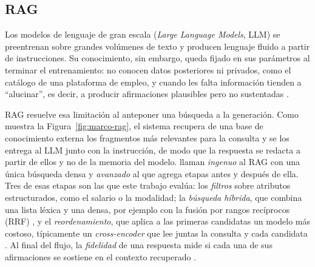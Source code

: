 \subsection{RAG}
\label{sec:marco-rag}

Los modelos de lenguaje de gran escala (\textit{Large Language Models}, LLM) se preentrenan sobre grandes volúmenes de texto y producen lenguaje fluido a partir de instrucciones. Su conocimiento, sin embargo, queda fijado en sus parámetros al terminar el entrenamiento: no conocen datos posteriores ni privados, como el catálogo de una plataforma de empleo, y cuando les falta información tienden a \enquote{alucinar}, es decir, a producir afirmaciones plausibles pero no sustentadas \citep{Gao2023}.

RAG \citep{Lewis2020} resuelve esa limitación al anteponer una búsqueda a la generación. Como muestra la Figura~\ref{fig:marco-rag}, el sistema recupera de una base de conocimiento externa los fragmentos más relevantes para la consulta y se los entrega al LLM junto con la instrucción, de modo que la respuesta se redacta a partir de ellos y no de la memoria del modelo. \citet{Gao2023} llaman \emph{ingenuo} al RAG con una única búsqueda densa y \emph{avanzado} al que agrega etapas antes y después de ella. Tres de esas etapas son las que este trabajo evalúa: los \emph{filtros} sobre atributos estructurados, como el salario o la modalidad; la \emph{búsqueda híbrida}, que combina una lista léxica y una densa, por ejemplo con la fusión por rangos recíprocos (RRF) \citep{Cormack2009}, y el \emph{reordenamiento}, que aplica a las primeras candidatas un modelo más costoso, típicamente un \textit{cross-encoder} que lee juntas la consulta y cada candidata \citep{Nogueira2019}. Al final del flujo, la \emph{fidelidad} de una respuesta mide si cada una de sus afirmaciones se sostiene en el contexto recuperado \citep{Es2024}.

